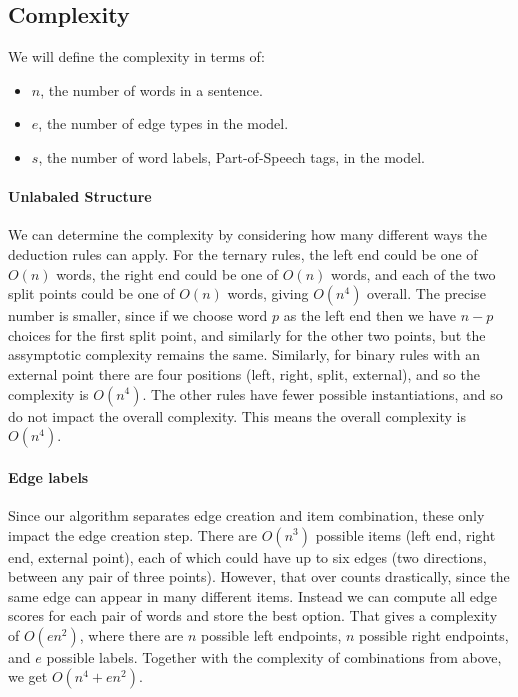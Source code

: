 \subsection{Complexity}

We will define the complexity in terms of:

\begin{itemize}
  \item $n$, the number of words in a sentence.
  \item $e$, the number of edge types in the model.
  \item $s$, the number of word labels, \myeg Part-of-Speech tags, in the model.
\end{itemize}

\paragraph{Unlabaled Structure}
We can determine the complexity by considering how many different ways the deduction rules can apply.
For the ternary rules, the left end could be one of $O(n)$ words, the right end could be one of $O(n)$ words, and each of the two split points could be one of $O(n)$ words, giving $O(n^4)$ overall.
The precise number is smaller, since if we choose word $p$ as the left end then we have $n-p$ choices for the first split point, and similarly for the other two points, but the assymptotic complexity remains the same.
Similarly, for binary rules with an external point there are four positions (left, right, split, external), and so the complexity is $O(n^4)$.
The other rules have fewer possible instantiations, and so do not impact the overall complexity.
This means the overall complexity is $O(n^4)$.

\paragraph{Edge labels}
Since our algorithm separates edge creation and item combination, these only impact the edge creation step.
There are $O(n^3)$ possible items (left end, right end, external point), each of which could have up to six edges (two directions, between any pair of three points).
However, that over counts drastically, since the same edge can appear in many different items.
Instead we can compute all edge scores for each pair of words and store the best option.
That gives a complexity of $O(e n^2)$, where there are $n$ possible left endpoints, $n$ possible right endpoints, and $e$ possible labels.
Together with the complexity of combinations from above, we get $O(n^4 + e n^2)$.

